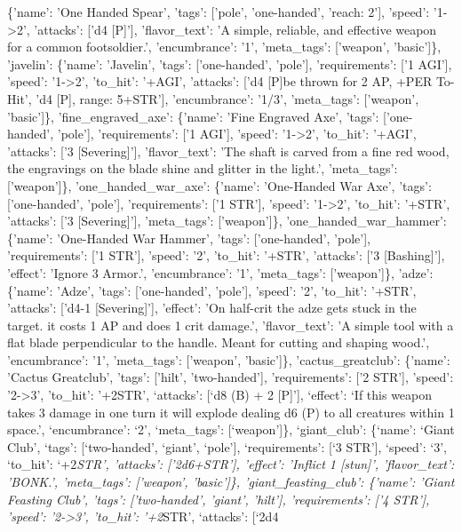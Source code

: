 \documentclass[
  letterpaper,
  DIV=11,
  numbers=noendperiod]{scrartcl}
\begin{document}
{\{'name': 'One Handed Spear', 'tags': {[}'pole', 'one-handed', 'reach:
2'{]}, 'speed': '1-\textgreater2', 'attacks': {[}'d4 {[}P{]}'{]},
'flavor\_text': 'A simple, reliable, and effective weapon for a common
footsoldier.', 'encumbrance': '1', 'meta\_tags': {[}'weapon',
'basic'{]}\}, 'javelin': \{'name': 'Javelin', 'tags': {[}'one-handed',
'pole'{]}, 'requirements': {[}'1 AGI'{]}, 'speed': '1-\textgreater2',
'to\_hit': '+AGI', 'attacks': {[}'d4 {[}P{]}\nCan be thrown for 2 AP,
+PER To-Hit', 'd4 {[}P{]}, range: 5+STR'{]}, 'encumbrance': '1/3',
'meta\_tags': {[}'weapon', 'basic'{]}\}, 'fine\_engraved\_axe':
\{'name': 'Fine Engraved Axe', 'tags': {[}'one-handed', 'pole'{]},
'requirements': {[}'1 AGI'{]}, 'speed': '1-\textgreater2', 'to\_hit':
'+AGI', 'attacks': {[}'3 {[}Severing{]}'{]}, 'flavor\_text': 'The shaft
is carved from a fine red wood, the engravings on the blade shine and
glitter in the light.', 'meta\_tags': {[}'weapon'{]}\},
'one\_handed\_war\_axe': \{'name': 'One-Handed War Axe', 'tags':
{[}'one-handed', 'pole'{]}, 'requirements': {[}'1 STR'{]}, 'speed':
'1-\textgreater2', 'to\_hit': '+STR', 'attacks': {[}'3
{[}Severing{]}'{]}, 'meta\_tags': {[}'weapon'{]}\},
'one\_handed\_war\_hammer': \{'name': 'One-Handed War Hammer', 'tags':
{[}'one-handed', 'pole'{]}, 'requirements': {[}'1 STR'{]}, 'speed': '2',
'to\_hit': '+STR', 'attacks': {[}'3 {[}Bashing{]}'{]}, 'effect': 'Ignore
3 Armor.', 'encumbrance': '1', 'meta\_tags': {[}'weapon'{]}\}, 'adze':
\{'name': 'Adze', 'tags': {[}'one-handed', 'pole'{]}, 'speed': '2',
'to\_hit': '+STR', 'attacks': {[}'d4-1 {[}Severing{]}'{]}, 'effect': 'On
half-crit the adze gets stuck in the target. \nRemoving it costs 1 AP
and does 1 crit damage.', 'flavor\_text': 'A simple tool with a flat
blade perpendicular to the handle. Meant for cutting and shaping wood.',
'encumbrance': '1', 'meta\_tags': {[}'weapon', 'basic'{]}\},
'cactus\_greatclub': \{'name': 'Cactus Greatclub', 'tags': {[}'hilt',
'two-handed'{]}, 'requirements': {[}'2 STR'{]}, 'speed':
'2-\textgreater3', 'to\_hit': '+2}STR', `attacks': {[}`d8 (B) + 2
{[}P{]}'{]}, `effect': `If this weapon takes 3 damage in one turn it
will explode dealing d6 (P) to all creatures within 1 space.',
`encumbrance': `2', `meta\_tags': {[}`weapon'{]}\}, `giant\_club':
\{`name': `Giant Club', `tags': {[}`two-handed', `giant', `pole'{]},
`requirements': {[}`3 STR'{]}, `speed': `3', `to\_hit': `+2\emph{STR',
'attacks': {[}'2d6+STR'{]}, 'effect': 'Inflict 1 {[}stun{]}',
'flavor\_text': 'BONK.', 'meta\_tags': {[}'weapon', 'basic'{]}\},
'giant\_feasting\_club': \{'name': 'Giant Feasting Club', 'tags':
{[}'two-handed', 'giant', 'hilt'{]}, 'requirements': {[}'4 STR'{]},
'speed': '2-\textgreater3', 'to\_hit': '+2}STR', `attacks': {[}`2d4
\end{document}
